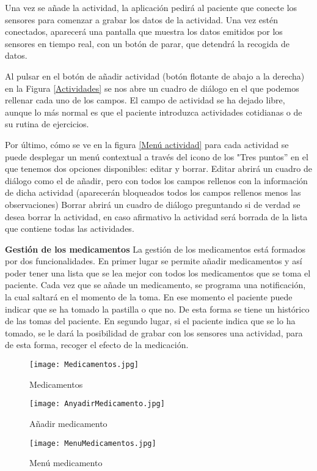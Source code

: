 \documentclass[11pt,spanish]{article}
\begin{document}
Una vez se añade la actividad, la aplicación pedirá al paciente que conecte los sensores para comenzar a grabar los datos de la actividad. Una vez estén conectados, aparecerá una pantalla que muestra los datos emitidos por los sensores en tiempo real, con un botón de parar, que detendrá la recogida de datos.
\newline

Al pulsar en el botón de añadir actividad (botón flotante de abajo a la derecha) en la Figura \ref{Actividades} se nos abre un cuadro de diálogo en el que podemos rellenar cada uno de los campos. El campo de actividad se ha dejado libre, aunque lo más normal es que el paciente introduzca actividades cotidianas o de su rutina de ejercicios.
\newline

Por último, cómo se ve en la figura \ref{Menú actividad} para cada actividad se puede desplegar un menú contextual a través del icono de los "Tres puntos'' en el que tenemos dos opciones disponibles: editar y borrar. Editar abrirá un cuadro de diálogo como el de añadir, pero con todos los campos rellenos con la información de dicha actividad (aparecerán bloqueados todos los campos rellenos menos las observaciones) Borrar abrirá un cuadro de diálogo preguntando si de verdad se desea borrar la actividad, en caso afirmativo la actividad será borrada de la lista que contiene todas las actividades.
\newline

{\bf Gestión de los medicamentos}
\newline
\newline
La gestión de los medicamentos está formados por dos funcionalidades. En primer lugar se permite añadir medicamentos y así poder tener una lista que se lea mejor con todos los medicamentos que se toma el paciente. Cada vez que se añade un medicamento, se programa una notificación, la cual saltará en el momento de la toma. En ese momento el paciente puede indicar que se ha tomado la pastilla o que no. De esta forma se tiene un histórico de las tomas del paciente. En segundo lugar, si el paciente indica que se lo ha tomado, se le dará la posibilidad de grabar con los sensores una actividad, para de esta forma, recoger el efecto de la medicación.
\begin{figure}[!htb]
  \texttt{[image: Medicamentos.jpg]}
  \caption{Medicamentos}
  \label{Medicamentos}
\endminipage\hfill
{}
  \texttt{[image: AnyadirMedicamento.jpg]}
  \caption{Añadir medicamento}
  \label{Añadir medicamento}
\endminipage\hfill
{}%
  \texttt{[image: MenuMedicamentos.jpg]}
  \caption{Menú medicamento}
  \label{Menú medicamento}
\endminipage
\end{figure}
\end{document}
